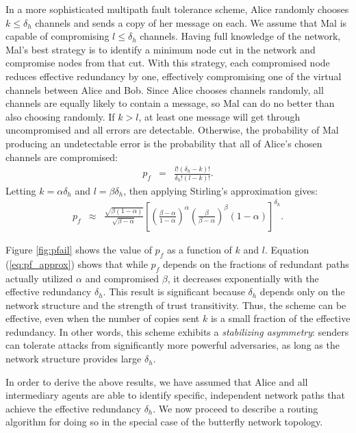 \documentclass{sig-alternate-05-2015}
\newcommand{\beq}{\begin{eqnarray}}
\newcommand{\eeq}{\end{eqnarray}}
\begin{document}
In a more sophisticated multipath fault tolerance scheme,
Alice randomly chooses $k \leq \delta_h$ channels and sends a copy of
her message on each.
We assume that Mal is capable of compromising $l \leq \delta_h$ channels.
Having full knowledge of the network,
Mal's best strategy is to identify a minimum node cut in the network
and compromise nodes from that cut.
With this strategy, each compromised node reduces effective redundancy by one,
effectively compromising one of the virtual channels between Alice and Bob.
Since Alice chooses channels randomly,
all channels are equally likely to contain a message,
so Mal can do no better than also choosing randomly.
If $k > l$, at least one message will get through uncompromised and all
errors are detectable.
Otherwise, the probability of Mal producing an undetectable error is
the probability that all of Alice's chosen channels are compromised:
\beq
\label{eq:pf}
p_f &=& \frac{l!(\delta_h-k)!}{\delta_h!(l-k)!}.
\eeq
Letting $k=\alpha \delta_h$ and $l=\beta \delta_h$, then applying Stirling's
approximation gives:
\begin{eqnarray}
\label{eq:pf_approx}
p_f &\approx&
\frac{\sqrt{\beta(1-\alpha)}}{\sqrt{\beta-\alpha}}
\left[
    \left( \frac{\beta-\alpha}{1-\alpha} \right)^{\alpha}
    \left( \frac{\beta}{\beta-\alpha} \right)^{\beta}
    (1-\alpha)
\right]^{\delta_h}.
\end{eqnarray}

Figure \ref{fig:pfail} shows the value of $p_f$
as a function of $k$ and $l$.
Equation (\ref{eq:pf_approx}) shows that while $p_f$
depends on the fractions of
redundant paths actually utilized $\alpha$ and compromised $\beta$,
it decreases exponentially with the effective redundancy $\delta_h$.
This result is significant because $\delta_h$
depends only on the network structure
and the strength of trust transitivity.
Thus, the scheme can be effective, even when the number of copies
sent $k$ is a small fraction of the effective redundancy.
In other words, this scheme exhibits a {\em stabilizing asymmetry}:
senders can tolerate attacks from significantly more powerful
adversaries,
as long as the network structure provides large $\delta_h$.

In order to derive the above results, we have assumed that Alice and all
intermediary agents are able to identify specific,
independent network paths that achieve the effective redundancy $\delta_h$.
We now proceed to describe a routing algorithm for doing so in the special case
of the butterfly network topology.
\end{document}
